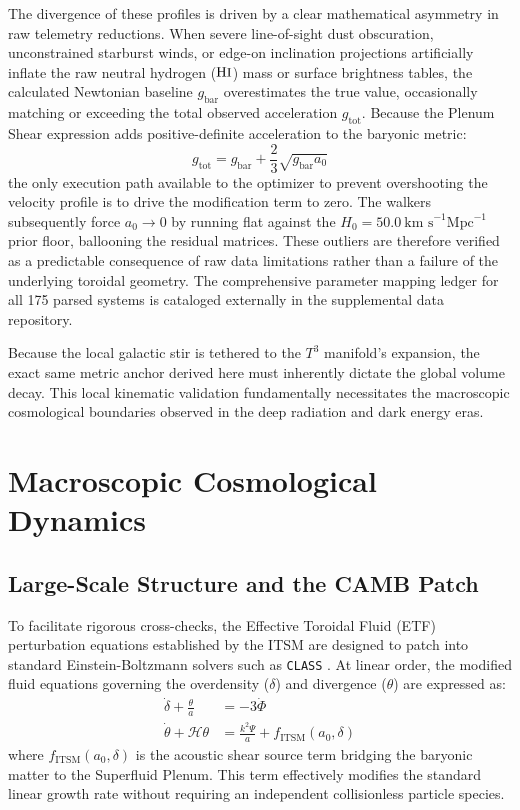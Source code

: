 \documentclass[aps,prd,10pt,twocolumn,superscriptaddress,nofootinbib,floatfix]{revtex4-2}
\begin{document}
The divergence of these profiles is driven by a clear mathematical asymmetry in raw telemetry reductions. When severe line-of-sight dust obscuration, unconstrained starburst winds, or edge-on inclination projections artificially inflate the raw neutral hydrogen ($\text{H\small I}$) mass or surface brightness tables, the calculated Newtonian baseline $g_{\text{bar}}$ overestimates the true value, occasionally matching or exceeding the total observed acceleration $g_{\text{tot}}$. Because the Plenum Shear expression adds positive-definite acceleration to the baryonic metric:
\begin{equation}
g_{\text{tot}} = g_{\text{bar}} + \frac{2}{3}\sqrt{g_{\text{bar}} a_0}
\end{equation}
the only execution path available to the optimizer to prevent overshooting the velocity profile is to drive the modification term to zero. The walkers subsequently force $a_0 \to 0$ by running flat against the $H_0 = 50.0 \ \text{km s}^{-1} \text{Mpc}^{-1}$ prior floor, ballooning the residual matrices. These outliers are therefore verified as a predictable consequence of raw data limitations rather than a failure of the underlying toroidal geometry. The comprehensive parameter mapping ledger for all 175 parsed systems is cataloged externally in the supplemental data repository.

Because the local galactic stir is tethered to the $T^3$ manifold's expansion, the exact same metric anchor derived here must inherently dictate the global volume decay. This local kinematic validation fundamentally necessitates the macroscopic cosmological boundaries observed in the deep radiation and dark energy eras.

\section{Macroscopic Cosmological Dynamics}

\subsection{Large-Scale Structure and the CAMB Patch}
To facilitate rigorous cross-checks, the Effective Toroidal Fluid (ETF) perturbation equations established by the ITSM are designed to patch into standard Einstein-Boltzmann solvers such as \texttt{CLASS} \cite{class_code}. At linear order, the modified fluid equations governing the overdensity ($\delta$) and divergence ($\theta$) are expressed as:
\begin{align}
\dot{\delta} + \frac{\theta}{a} &= -3\dot{\Phi} \\
\dot{\theta} + \mathcal{H}\theta &= \frac{k^2\Psi}{a} + f_{\text{ITSM}}(a_0, \delta)
\end{align}
where $f_{\text{ITSM}}(a_0, \delta)$ is the acoustic shear source term bridging the baryonic matter to the Superfluid Plenum. This term effectively modifies the standard linear growth rate without requiring an independent collisionless particle species.
\end{document}
